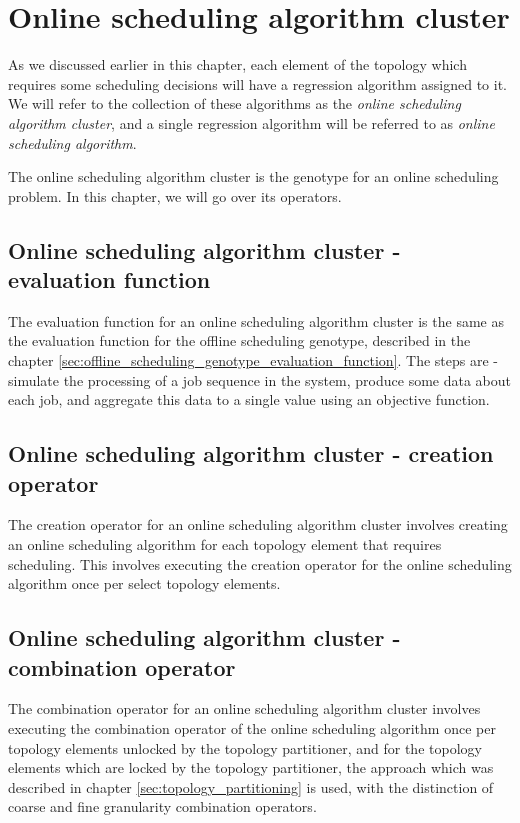 \section{Online scheduling algorithm cluster}
\label{sec:online_scheduling_algorithm_cluster}

As we discussed earlier in this chapter, each element of the topology which requires some scheduling decisions will have a regression algorithm assigned to it. We will refer to the collection of these algorithms as the \textit{online scheduling algorithm cluster}, and a single regression algorithm will be referred to as \textit{online scheduling algorithm}.

The online scheduling algorithm cluster is the genotype for an online scheduling problem. In this chapter, we will go over its operators.

\subsection{Online scheduling algorithm cluster - evaluation function}
The evaluation function for an online scheduling algorithm cluster is the same as the evaluation function for the offline scheduling genotype, described in the chapter \ref{sec:offline_scheduling_genotype_evaluation_function}. The steps are - simulate the processing of a job sequence in the system, produce some data about each job, and aggregate this data to a single value using an objective function.

\subsection{Online scheduling algorithm cluster - creation operator}
The creation operator for an online scheduling algorithm cluster involves creating an online scheduling algorithm for each topology element that requires scheduling. This involves executing the creation operator for the online scheduling algorithm once per select topology elements.

\subsection{Online scheduling algorithm cluster - combination operator}
The combination operator for an online scheduling algorithm cluster involves executing the combination operator of the online scheduling algorithm once per topology elements unlocked by the topology partitioner, and for the topology elements which are locked by the topology partitioner, the approach which was described in chapter \ref{sec:topology_partitioning} is used, with the distinction of coarse and fine granularity combination operators.

